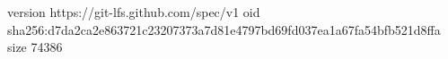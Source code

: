 version https://git-lfs.github.com/spec/v1
oid sha256:d7da2ca2e863721c23207373a7d81e4797bd69fd037ea1a67fa54bfb521d8ffa
size 74386
